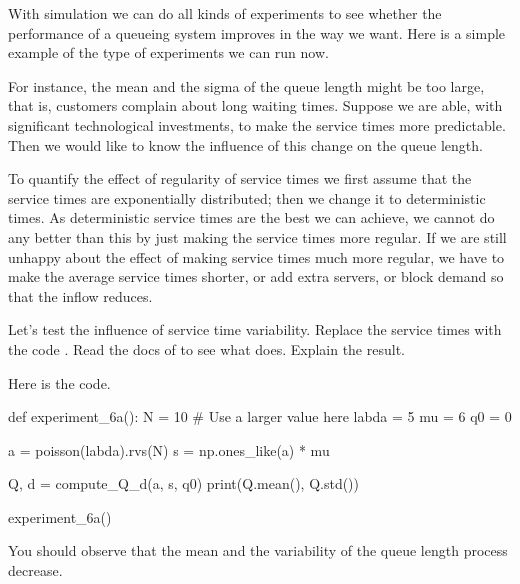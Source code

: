 With simulation we can do all kinds of experiments to see whether the performance of a queueing system improves in the way we want.
Here is a simple example of the type of experiments we can run now.

For instance, the mean and the sigma of the queue length might be too large, that is, customers complain about long waiting times.
Suppose we are able, with significant technological investments, to make the service times more predictable.
Then we would like to know the influence of this change on the queue length.

To quantify the effect of regularity of service times we first assume that the service times are exponentially distributed; then we change it to deterministic times.
As deterministic service times are the best we can achieve, we cannot do any better than this by just making the service times more regular.
If we are still unhappy about the effect of making service times much more regular, we have to make the average service times shorter, or add extra servers, or block demand so that the inflow reduces.

\begin{exercise}
  Let's test the influence of service time variability.
  Replace the service times with the code .
  Read the docs of  to see what  does.
  Explain the result.

\begin{solution}
Here is the code.
\begin{pyverbatim}
def experiment_6a():
    N = 10  # Use a larger value here
    labda = 5
    mu = 6
    q0 = 0

    a = poisson(labda).rvs(N)
    s = np.ones_like(a) * mu

    Q, d = compute_Q_d(a, s, q0)
    print(Q.mean(), Q.std())


experiment_6a()
\end{pyverbatim}

You should observe that the mean and the variability of the queue length process decrease.
\end{solution}
\end{exercise}



